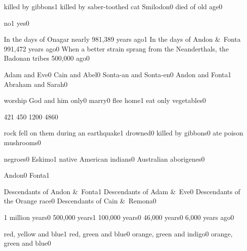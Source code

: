 {killed by gibbons}{1}
{killed by saber-toothed cat Smilodon}{0}
{died of old age}{0}
\qstop

{no}{1}
{yes}{0}
\qstop


{In the days of Onagar nearly 981,389 years ago}{1}
{In the days of Andon \&\ Fonta 991,472 years ago}{0}
{When a better strain sprang from the Neanderthals, the Badonan tribes 500,000 ago}{0}
\qstop

{Adam and Eve}{0}
{Cain and Abel}{0}
{Sonta\hyp{}an and Sonta\hyp{}en}{0}
{Andon and Fonta}{1}
{Abraham and Sarah}{0}
\qstop

{worship God and him only}{0}
{marry}{0}
{flee home}{1}
{eat only vegetables}{0}
\qstop

{42}{1}
{45}{0}
{120}{0}
{486}{0}
\qstop

{rock fell on them during an earthquake}{1}
{drowned}{0}
{killed by gibbons}{0}
{ate poison mushrooms}{0}
\qstop

{negroes}{0}
{Eskimo}{1}
{native American indians}{0}
{Australian aborigenes}{0}
\qstop

{Andon}{0}
{Fonta}{1}
\qstop

{Descendants of Andon \&\ Fonta}{1}
{Descendants of Adam \&\ Eve}{0}
{Descendants of the Orange race}{0}
{Descendants of Cain \&\ Remona}{0}
\qstop


{1 million years}{0}
{500,000 years}{1}
{100,000 years}{0}
{46,000 years}{0}
{6,000 years ago}{0}
\qstop

{red, yellow and blue}{1}
{red, green and blue}{0}
{orange, green and indigo}{0}
{orange, green and blue}{0}
\qstop


